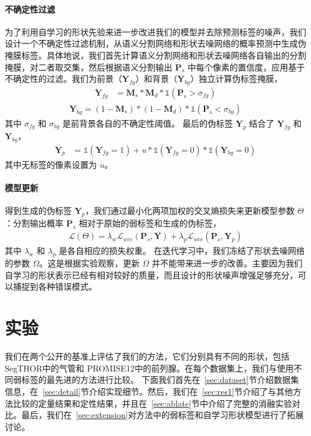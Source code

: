 \paragraph{不确定性过滤}
为了利用自学习的形状先验来进一步改进我们的模型并去除预测标签的噪声，我们设计一个不确定性过滤机制，从语义分割网络和形状去噪网络的概率预测中生成伪掩膜标签。具体地说，我们首先计算语义分割网络和形状去噪网络各自输出的分割掩膜，对二者取交集，然后根据语义分割输出 $\mathbf{P}_s$ 中每个像素的置信度，应用基于不确定性的过滤。我们为前景（$\mathbf{Y}_{fg}$）和背景（$\mathbf{Y}_{bg}$）独立计算伪标签掩膜，
\begin{align}   \label{eq1}
    \mathbf{Y}_{fg} &= \mathbf{M}_s * \mathbf{M}_d * \mathds{1} (\mathbf{P}_s > \sigma_{fg})
\end{align}
\begin{align}   \label{eq2}
    \mathbf{Y}_{bg} = (1-\mathbf{M}_s) * (1-\mathbf{M}_d) * \mathds{1} (\mathbf{P}_s < \sigma_{bg})
\end{align}
其中 $\sigma_{fg}$ 和 $\sigma_{bg}$ 是前背景各自的不确定性阈值。
最后的伪标签 $\mathbf{Y}_p$ 结合了 $\mathbf{Y}_{fg}$ 和 $\mathbf{Y}_{bg}$，
\begin{align}
    \mathbf{Y}_p &= \mathds{1}(\mathbf{Y}_{fg} = 1) + u * \mathds{1}(\mathbf{Y}_{fg} = 0) * \mathds{1}(\mathbf{Y}_{bg} = 0)
\end{align}
其中无标签的像素设置为 $u$。

\paragraph{模型更新}
得到生成的伪标签 $\mathbf{Y}_p$，我们通过最小化两项加权的交叉熵损失来更新模型参数 $\Theta$ ：分割输出概率 $\mathbf{P}_s$ 相对于原始的弱标签和生成的伪标签，
\begin{align} \label{eq3}
    \mathcal{L} (\Theta) = \lambda_w \mathcal{L}_{wce} (\mathbf{P}_s, \mathbf{Y}) + \lambda_p \mathcal{L}_{wce} (\mathbf{P}_s, \mathbf{Y}_p)
\end{align}
其中 $\lambda_w$ 和 $\lambda_p$ 是各自相应的损失权重。
在迭代学习中，我们冻结了形状去噪网络的参数 $\Omega$。这是根据实验观察，更新 $\Omega$ 并不能带来进一步的改善。主要因为我们自学习的形状表示已经有相对较好的质量，而且设计的形状噪声增强足够充分，可以捕捉到各种错误模式。


\section{实验}
我们在两个公开的基准上评估了我们的方法，它们分别具有不同的形状，包括 SegTHOR\citep{trullo2019multiorgan}中的气管和 PROMISE12\citep{Litjens2014EvaluationOP}中的前列腺。在每个数据集上，我们与使用不同弱标签的最先进的方法进行比较。
下面我们首先在~\ref{sec:dataset}节介绍数据集信息，在~\ref{sec:detail}节介绍实现细节。然后，我们在~\ref{sec:res1}节介绍了与其他方法比较的定量结果和定性结果，并且在~\ref{sec:ablate}节中介绍了完整的消融实验对比。最后，我们在~\ref{sec:extension}对方法中的弱标签和自学习形状模型进行了拓展讨论。

